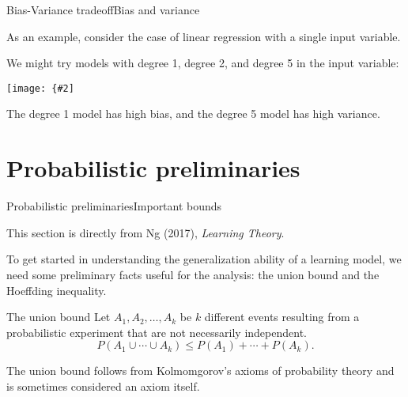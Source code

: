 \documentclass{beamer}
\newcommand{\myfig}[3]{\centerline{\texttt{[image: \{\#2]}}}
    \centerline{\scriptsize #3}}
\begin{document}
\begin{frame}{Bias-Variance tradeoff}{Bias and variance}

  As an example, consider the case of linear regression with a single
  input variable.

  \medskip

  We might try models with degree 1, degree 2, and degree 5 in the input variable:

  \medskip

  \myfig{3.5in}{over-under}{Ng (2017), CS229 lecture notes}

  \medskip

  The degree 1 model has high bias, and the degree 5 model has high
  variance.

\end{frame}


\section{Probabilistic preliminaries}

\begin{frame}{Probabilistic preliminaries}{Important bounds}

  This section is directly from Ng (2017), \textit{Learning Theory}.

  \medskip
  
  To get started in understanding the generalization ability of a
  learning model, we need some preliminary facts useful for the
  analysis: the \alert{union bound} and the \alert{Hoeffding
    inequality}.

  \medskip

  \begin{block}{The \alert{union bound}}
    Let $A_1, A_2, \ldots, A_k$ be $k$ different events resulting from
    a probabilistic experiment that are not necessarily independent.
    \[ P(A_1 \cup \cdots \cup A_k) \le P(A_1)+\cdots+P(A_k). \]
  \end{block}

  \medskip

  The union bound follows from Kolmomgorov's axioms of probability
  theory and is sometimes considered an axiom itself.
  
\end{frame}
\end{document}
